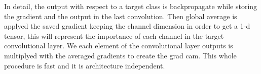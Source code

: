 \documentclass[../document.tex]{subfiles}
\begin{document}
In detail, the output with respect to a target class is backpropagate while storing the gradient and the output in the last convolution. Then global average is applyed the saved gradient keeping the channel dimension in order to get a 1-d tensor, this will represent the importance of each channel in the target convolutional layer. We  each element of the convolutional layer outputs is multiplyed with the averaged gradients to create the grad cam. This whole procedure is fast and it is architecture independent.
\end{document}
